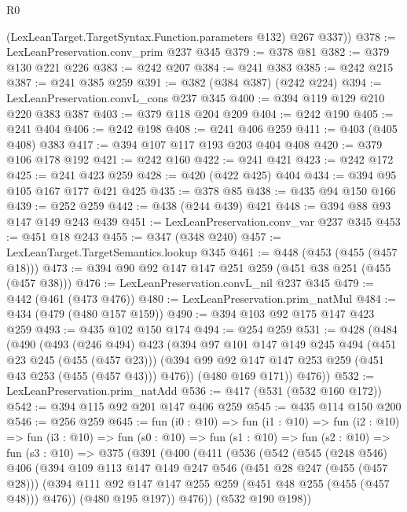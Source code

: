 \begin{lexlean}{R0}
\begin{coremodule}
        (LexLeanTarget.TargetSyntax.Function.parameters @132)
        @267
        @337))
@378 := LexLeanPreservation.conv_prim @237 @345
@379 := @378 @81
@382 := @379 @130 @221 @226
@383 := @242 @207
@384 := @241 @383
@385 := @242 @215
@387 := @241 @385 @259
@391 := @382 (@384 @387) (@242 @224)
@394 := LexLeanPreservation.convL_cons @237 @345
@400 := @394 @119 @129 @210 @220 @383 @387
@403 := @379 @118 @204 @209
@404 := @242 @190
@405 := @241 @404
@406 := @242 @198
@408 := @241 @406 @259
@411 := @403 (@405 @408) @383
@417 := @394 @107 @117 @193 @203 @404 @408
@420 := @379 @106 @178 @192
@421 := @242 @160
@422 := @241 @421
@423 := @242 @172
@425 := @241 @423 @259
@428 := @420 (@422 @425) @404
@434 := @394 @95 @105 @167 @177 @421 @425
@435 := @378 @85
@438 := @435 @94 @150 @166
@439 := @252 @259
@442 := @438 (@244 @439) @421
@448 := @394 @88 @93 @147 @149 @243 @439
@451 := LexLeanPreservation.conv_var @237 @345
@453 := @451 @18 @243
@455 := @347 (@348 @240)
@457 := LexLeanTarget.TargetSemantics.lookup @345
@461 := @448 (@453 (@455 (@457 @18)))
@473 := @394 @90 @92 @147 @147 @251 @259 (@451 @38 @251 (@455 (@457 @38)))
@476 := LexLeanPreservation.convL_nil @237 @345
@479 := @442 (@461 (@473 @476))
@480 := LexLeanPreservation.prim_natMul
@484 := @434 (@479 (@480 @157 @159))
@490 := @394 @103 @92 @175 @147 @423 @259
@493 := @435 @102 @150 @174
@494 := @254 @259
@531 := @428
    (@484
      (@490
        (@493
          (@246 @494)
          @423
          (@394
            @97
            @101
            @147
            @149
            @245
            @494
            (@451 @23 @245 (@455 (@457 @23)))
            (@394 @99 @92 @147 @147 @253 @259 (@451 @43 @253 (@455 (@457 @43))) @476))
          (@480 @169 @171))
        @476))
@532 := LexLeanPreservation.prim_natAdd
@536 := @417 (@531 (@532 @160 @172))
@542 := @394 @115 @92 @201 @147 @406 @259
@545 := @435 @114 @150 @200
@546 := @256 @259
@645 := fun (i0 : @10) =>
  fun (i1 : @10) =>
  fun (i2 : @10) =>
  fun (i3 : @10) =>
  fun (s0 : @10) =>
  fun (s1 : @10) =>
  fun (s2 : @10) =>
  fun (s3 : @10) =>
  @375
    (@391
      (@400
        (@411
          (@536
            (@542
              (@545
                (@248 @546)
                @406
                (@394
                  @109
                  @113
                  @147
                  @149
                  @247
                  @546
                  (@451 @28 @247 (@455 (@457 @28)))
                  (@394 @111 @92 @147 @147 @255 @259 (@451 @48 @255 (@455 (@457 @48))) @476))
                (@480 @195 @197))
              @476))
          (@532 @190 @198))

\end{coremodule}
\end{lexlean}
